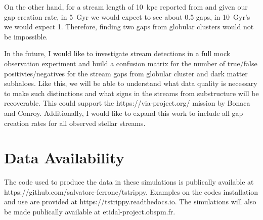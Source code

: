 \documentclass[draft]{aa}
\begin{document}
  On the other hand, for a stream length of 10~kpc reported from \citet{2020ApJ...889...70B} and given our gap creation rate, in 5~Gyr we would expect to see about 0.5 gaps, in 10~Gyr's we would expect 1. Therefore, finding two gaps from globular clusters would not be impossible.

  In the future, I would like to investigate stream detections in a full mock observation experiment and build a confusion matrix for the number of true/false positivies/negatives for the stream gaps from globular cluster and dark matter subhaloes. Like this, we will be able to understand what data quality is necessary to make such distinctions and what signs in the streams from substructure will be recoverable. This could support the https://via-project.org/ mission by Bonaca and Conroy. Additionally, I would like to expand this work to include all gap creation rates for all observed stellar streams. 

\section*{Data Availability}

  The code used to produce the data in these simulations is publically available at https://github.com/salvatore-ferrone/tstrippy. Examples on the codes installation and use are provided at https://tstrippy.readthedocs.io. The simulations will also be made publically available at etidal-project.obspm.fr.







\end{document}
